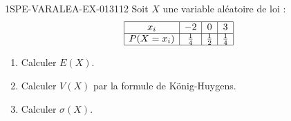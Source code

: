 \begin{exercice}{1SPE-VARALEA-EX-013}{1}{12}
Soit $X$ une variable aléatoire de loi :
\[
\begin{array}{|c|c|c|c|}
\hline
x_i & -2 & 0 & 3 \\
\hline
P(X=x_i) & \frac{1}{4} & \frac{1}{2} & \frac{1}{4} \\
\hline
\end{array}
\]

\begin{enumerate}
  \item Calculer $E(X)$.
  \item Calculer $V(X)$ par la formule de König-Huygens.
  \item Calculer $\sigma(X)$.
\end{enumerate}
\end{exercice}
